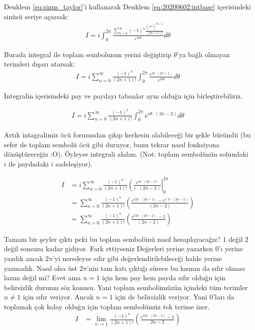 \documentclass{article}
\numberwithin{equation}{section}
\begin{document}
Denklem \eqref{eq:sinus_taylor}'i kullanarak Denklem \eqref{eq:20200602:intbase} içerisindeki sinüsü seriye açarsak: 
%
\begin{align}
 I = i\int_0^{2\pi} \frac{\sum_{n=0}^{\infty} (-1)^n \frac{(e^{i\theta} )^{2n+1}}{(2n+1)!}}{e^{3i\theta}}  d\theta
\end{align} 

Burada integral ile toplam sembolunun yerini değiştirip $\theta$'ya bağlı olmayan terimleri dışarı atarsak: 
\begin{align}
I = i \sum_{n=0}^{\infty} \frac{(-1)^n}{(2n+1)!}  \int_0^{2\pi} \frac{ e^{i\theta\cdot (2n+1)} }{e^{3i\theta}}  d\theta
\end{align} 

Integralin içerisindeki pay ve paydayı tabanlar aynı olduğu için birleştirebiliriz.

\begin{align}
I = i \sum_{n=0}^{\infty} \frac{(-1)^n}{(2n+1)!}  \int_0^{2\pi} e^{i\theta\cdot (2n-2)}  d\theta
\end{align} 

Artık intagralimiz öcü formundan çıkıp herkesin alabileceği bir şekle büründü (bu sefer de toplam sembolü öcü gibi duruyor, bunu tekrar nasıl fonksiyona dönüştüreceğiz :O). Öyleyse integrali alalım. (Not: toplam sembolünün solundaki $i$ ile paydadaki $i$ sadeleşiyor).

\begin{align}
I &= i\sum_{n=0}^{\infty} \frac{(-1)^n}{(2n+1)!} \left( \frac{ e^{i\theta\cdot (2n-2)}  }{i\cdot (2n-2)}\right|_0^{2\pi} \nonumber \\
&= \sum_{n=0}^{\infty} \frac{(-1)^n}{(2n+1)!} \left( \frac{ e^{i2\pi\cdot (2n-2)} -  e^{i\cdot  0\cdot (2n-2)}  }{(2n-2)}\right) \nonumber \\
&= \sum_{n=0}^{\infty} \frac{(-1)^n}{(2n+1)!} \left( \frac{ e^{i2\pi\cdot (2n-2)} -  1  }{(2n-2)}\right)
\end{align} 

Tamam bir şeyler çıktı peki bu toplam sembolünü nasıl hesaplayacağız? 1 değil 2 değil sonsuza kadar gidiyor. Fark ettiyseniz Değerleri yerine yazarken 0'ı yerine yazdık ancak $2\pi$'yi neredeyse sıfır gibi değerlendirilebileceği halde yerine yazmadık. Nasıl olsa üst $2\pi$'nin tam katı çıktığı sürece bu kısmın da sıfır olması lazım değil mi? Evet ama $n=1$ için hem pay hem payda sıfır olduğu için belirsizlik durumu söz konusu. Yani toplam sembolümüzün içindeki tüm terimler $n\neq 1$ için sıfır veriyor. Ancak $n=1$ için de belirsizlik veriyor. Yani 0'ları da toplamak çok kolay olduğu için toplam sembolümüz tek terime iner. 
\begin{align}
I&= \lim_{n \to 1} \frac{(-1)^n}{(2n+1)!} \left( \frac{ e^{i2\pi\cdot (2n-2)} -  1  }{ 2n-2}\right)
\end{align} 
\end{document}
